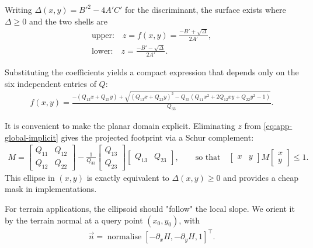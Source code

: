 Writing $\Delta(x,y)=B'^2-4A'C'$ for the discriminant, the surface exists where $\Delta\ge 0$ and the two shells are
\begin{align}
    \label{eq:app-upper}
    \text{upper:}\quad z = f(x,y) = \frac{-B' + \sqrt{ \Delta }}{ 2A' }, \\
    \label{eq:app-lower}
    \text{lower:}\quad z = \frac{-B' - \sqrt{\Delta}}{2A'}.
\end{align}

Substituting the coefficients yields a compact expression that depends only on the six independent entries of $Q$:
\begin{align}
    \label{eq:app-upper-final}
    f(x,y) = \frac{-(Q_{13}x+Q_{23}y) + \sqrt{(Q_{13}x+Q_{23}y)^2 - Q_{33} \left(Q_{11}x^2 + 2Q_{12}xy + Q_{22}y^2 - 1\right)} }{Q_{33}}.
\end{align}


It is convenient to make the planar domain explicit. Eliminating $z$ from \cref{eq:app-global-implicit} gives the projected footprint via a Schur complement:
\begin{align}
    M =
    \begin{bmatrix}
    Q_{11} & Q_{12}\\
    Q_{12} & Q_{22}
    \end{bmatrix}
    -
    \frac{1}{Q_{33}}
    \begin{bmatrix}
    Q_{13}\\ Q_{23}
    \end{bmatrix}
    \begin{bmatrix}
    Q_{13} & Q_{23}
    \end{bmatrix},
    \qquad
    \text{so that}\quad
    \begin{bmatrix}x & y\end{bmatrix} M \begin{bmatrix}x\\ y\end{bmatrix} \le 1.
\end{align}
This ellipse in $(x,y)$ is exactly equivalent to $\Delta(x,y)\ge 0$ and provides a cheap mask in implementations.

For terrain applications, the ellipsoid should "follow" the local slope. We orient it by the terrain normal at a query point $(x_0,y_0)$, with
\begin{align}
    \label{eq:app-terrain-normal}
    \vec n=\operatorname{normalise} [-\partial_x H, -\partial_y H, 1]^\top.
\end{align}

